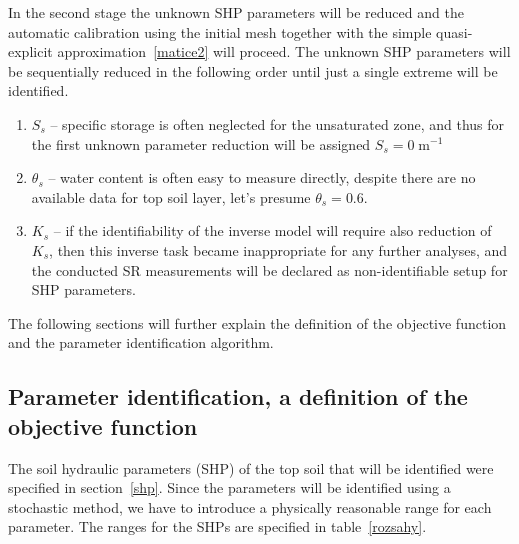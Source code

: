 \documentclass[review]{elsarticle}
\begin{document}
In the second stage the unknown SHP parameters will be reduced and the automatic calibration using the initial mesh together with the simple quasi-explicit approximation~\eqref{matice2} will proceed.
The unknown SHP parameters will be sequentially reduced in the following order until just a single extreme will be identified.
\begin{enumerate}[label=({\bf \Roman*})]
\item $S_s$ -- specific storage is often neglected for the unsaturated zone, and thus for the first unknown parameter reduction will be assigned $S_s=0\;\mbox{m}^{-1}$
\item $\theta_s$ -- water content is often easy to measure directly, despite there are no available data for top soil layer, let's presume $\theta_s = 0.6.$
\item $K_s$ -- if the identifiability of the inverse model will require also reduction of $K_s$, then this inverse task became inappropriate for any further analyses, and the conducted SR measurements will be declared as non-identifiable setup for SHP parameters.
\end{enumerate}


The following sections will further explain the definition of the objective function and the parameter identification algorithm.



\subsection{Parameter identification, a definition of the objective function} %
\label{objdef}

The soil hydraulic parameters (SHP) of the top soil that will be identified were specified in section~\ref{shp}.
Since the parameters will be identified using a stochastic method, we have to introduce a physically reasonable range for each parameter. The ranges for the SHPs are specified in table~\ref{rozsahy}.
\end{document}
